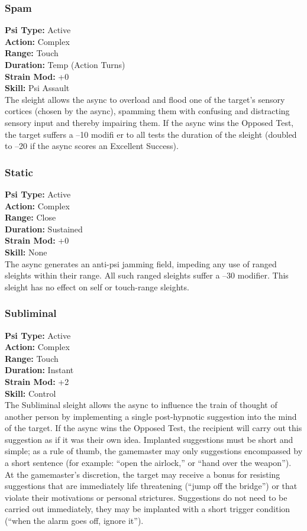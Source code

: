 \subsubsection{Spam} \textbf{Psi Type:} Active \\ \textbf{Action:} Complex \\ \textbf{Range:} Touch \\ \textbf{Duration:} Temp (Action Turns) \\ \textbf{Strain Mod:} +0 \\ \textbf{Skill:} Psi Assault \\ The sleight allows the async to overload and flood one of the target’s sensory cortices (chosen by the async), spamming them with confusing and distracting sensory input and thereby impairing them. If the async wins the Opposed Test, the target suffers a –10 modifi er to all tests the duration of the sleight (doubled to –20 if the async scores an Excellent Success). 

\subsubsection{Static} \textbf{Psi Type:} Active \\ \textbf{Action:} Complex \\ \textbf{Range:} Close \\ \textbf{Duration:} Sustained \\ \textbf{Strain Mod:} +0 \\ \textbf{Skill:} None\\ The async generates an anti-psi jamming field, impeding any use of ranged sleights within their range. All such ranged sleights suffer a –30 modifier. This sleight has no effect on self or touch-range sleights. 

\subsubsection{Subliminal} \textbf{Psi Type:} Active \\ \textbf{Action:} Complex \\ \textbf{Range:} Touch \\ \textbf{Duration:} Instant \\ \textbf{Strain Mod:} +2 \\ \textbf{Skill:} Control\\ The Subliminal sleight allows the async to influence the train of thought of another person by implementing a single post-hypnotic suggestion into the mind of the target. If the async wins the Opposed Test, the recipient will carry out this suggestion as if it was their own idea. Implanted suggestions must be short and simple; as a rule of thumb, the gamemaster may only suggestions encompassed by a short sentence (for example: “open the airlock,” or “hand over the weapon”). At the gamemaster’s discretion, the target may receive a bonus for resisting suggestions that are immediately life threatening (“jump off the bridge”) or that violate their motivations or personal strictures. Suggestions do not need to be carried out immediately, they may be implanted with a short trigger condition (“when the alarm goes off, ignore it”). 


